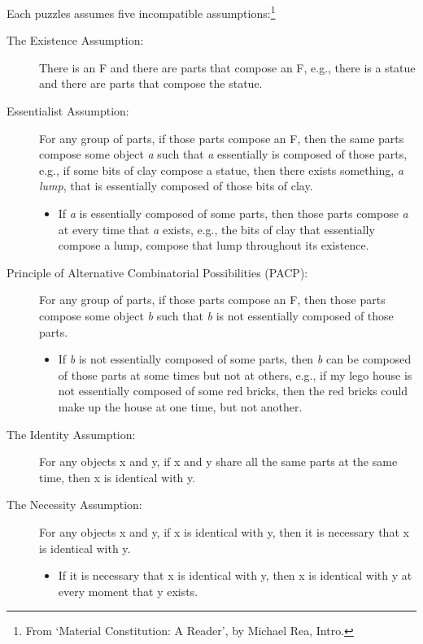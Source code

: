 \documentclass[9pt]{article}
\begin{document}
Each puzzles assumes five incompatible assumptions:\footnote{From `Material  Constitution: A  Reader',  by Michael Rea, Intro.}
\begin{description}
\item [The Existence Assumption:] There is an F and there are parts that compose an F, e.g., there is a statue and there are parts that compose the statue. 
\item [Essentialist Assumption:] For any group of parts, if those parts compose an F, then the same parts compose some object \emph{a} such that \emph{a} essentially is composed of those parts, e.g., if some bits of clay compose a statue, then there exists something, \emph{a lump}, that is essentially composed of those bits of clay. 
\begin{itemize}
\item If \emph{a} is essentially composed of some parts, then those parts compose \emph{a} at every time that \emph{a} exists, e.g., the bits of clay that essentially compose a lump, compose that lump throughout its existence. 
\end{itemize}
\item [Principle of Alternative Combinatorial Possibilities (PACP):] For any group of parts, if those parts compose an F, then those parts compose some object \emph{b} such that  \emph{b} is not essentially composed of those parts.
\begin{itemize}
\item If \emph{b} is not essentially composed of some parts, then \emph{b} can be composed of  those parts at some times but not at others, e.g., if my lego house is not essentially composed of some red bricks, then the red bricks could make up the house at one time, but not another. 
\end{itemize}
\item [The Identity Assumption:] For any objects x  and y, if x and y  share all the same parts at the same time, then x is identical with y. 

\item[The Necessity Assumption:] For any objects x  and y, if x is identical with y, then it is necessary that x is identical with y.
\begin{itemize}
\item If it is necessary that x is identical with y, then x is identical with y at every moment that y exists. 
\end{itemize}
\end{description}
\end{document}
